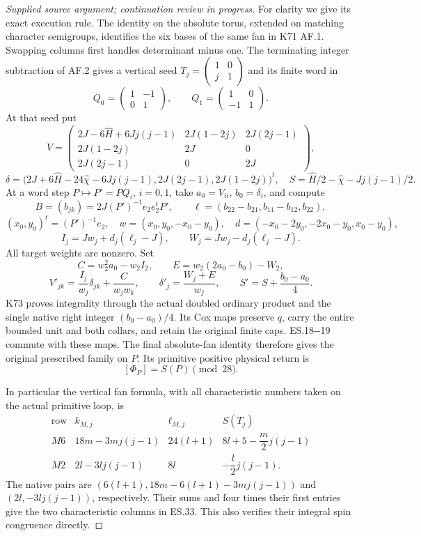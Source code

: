 \begin{proof}[Supplied source argument; continuation review in progress]
For clarity we give its exact execution rule. The identity
on the absolute torus, extended on matching character
semigroups, identifies the six bases of the same fan in
K71 AF.1. Swapping columns first handles determinant minus
one. The terminating integer subtraction of AF.2 gives a
vertical seed
\(T_j=\left(\begin{smallmatrix}1&0\\j&1\end{smallmatrix}\right)\)
and its finite word in
\[
 Q_0=\begin{pmatrix}1&-1\\0&1\end{pmatrix},
 \qquad Q_1=\begin{pmatrix}1&0\\-1&1\end{pmatrix}.
\]
At that seed put
\[
 V=\begin{pmatrix}
 2J-6\widehat H+6Jj(j-1)&2J(1-2j)&2J(2j-1)\\
 2J(1-2j)&2J&0\\
 2J(2j-1)&0&2J
 \end{pmatrix},
\]
\[
 \delta=\bigl(
 2J+6\widehat H-24\widehat\chi-6Jj(j-1),
 2J(2j-1),2J(1-2j)\bigr)^t,\quad
 S=\widehat H/2-\widehat\chi-Jj(j-1)/2.
 \tag{ES.29}
\]
At a word step \(P\mapsto P'=PQ_i\), \(i=0,1\), take
\(a_0=V_{ii}\), \(b_0=\delta_i\), and compute
\[
 B=(b_{jk})=2J(P')^{-1}e_2e_2^tP',\qquad
 \ell=(b_{22}-b_{21},b_{11}-b_{12},b_{22}),
\]
\[
 (x_0,y_0)^t=(P')^{-1}e_2,\quad
 w=(x_0,y_0,-x_0-y_0),\quad
 d=(-x_0-2y_0,-2x_0-y_0,x_0-y_0),
\]
\[
 I_j=Jw_j+d_j(\ell_j-J),\qquad
 W_j=Jw_j-d_j(\ell_j-J).
 \tag{ES.30}
\]
All target weights are nonzero. Set
\[
 C=w_2^2a_0-w_2I_2,\qquad
 E=w_2(2a_0-b_0)-W_2,
\]
\[
 V'_{jk}=\frac{I_j}{w_j}\delta_{jk}
             +\frac C{w_jw_k},\qquad
 \delta'_j=\frac{W_j+E}{w_j},\qquad
 S'=S+\frac{b_0-a_0}{4}.
 \tag{ES.31}
\]
K73 proves integrality through the actual doubled ordinary
product and the single native right integer
\((b_0-a_0)/4\). Its Cox maps preserve \(q\), carry the
entire bounded unit and both collars, and retain the original
finite caps. ES.18-\/-19 commute with these maps. The final
absolute-fan identity therefore gives the original prescribed
family on \(P\). Its primitive positive physical return is
\[
                         [\Phi_P]=S(P)\pmod {28}.
 \tag{ES.32}
\]

In particular the vertical fan formula, with all characteristic
numbers taken on the actual primitive loop, is
\[
 \begin{array}{c|c|c|c}
 \text{row}&k_{M,j}&\ell_{M,j}&S(T_j)\\ \hline
 M6&18m-3mj(j-1)&24(l+1)&8l+5-\dfrac m2j(j-1)\\
 M2&2l-3lj(j-1)&8l&-\dfrac l2j(j-1).
 \end{array}
 \tag{ES.33}
\]
The native pairs are
\((6(l+1),18m-6(l+1)-3mj(j-1))\) and
\((2l,-3lj(j-1))\), respectively. Their sums and four
times their first entries give the two characteristic
columns in ES.33. This also verifies their integral spin
congruence directly.


\end{proof}
